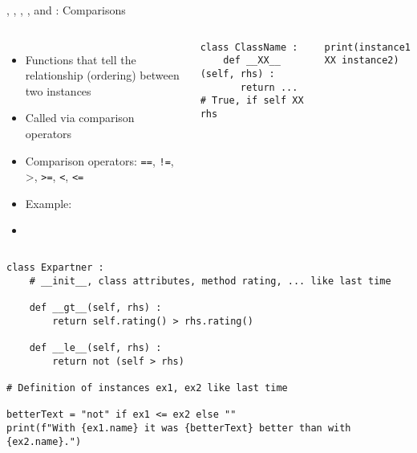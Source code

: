 
\begin{frame}[fragile]{, , , ,  and : Comparisons}
%
\begin{columns}[T]
\begin{itemize}
\item Functions that tell the relationship (ordering) between two instances
\item Called via comparison operators
\item Comparison operators: \texttt{==}, \texttt{!=}, >, \texttt{>=}, \texttt{<}, \texttt{<=}
\item Example:  
\item[\Thus] 
\end{itemize}
%
\begin{codebox}
\begin{verbatim}
class ClassName :
    def __XX__ (self, rhs) :
       return ... # True, if self XX rhs
\end{verbatim}
\end{codebox}
%
\begin{codebox}
\begin{verbatim}
print(instance1 XX instance2)
\end{verbatim}
\end{codebox}
\end{columns}
%
\end{frame}


\begin{frame}[fragile]
%
\begin{codebox}
\begin{verbatim}
class Expartner :
    # __init__, class attributes, method rating, ... like last time
    
    def __gt__(self, rhs) :
        return self.rating() > rhs.rating()
    
    def __le__(self, rhs) :
        return not (self > rhs)

# Definition of instances ex1, ex2 like last time

betterText = "not" if ex1 <= ex2 else ""
print(f"With {ex1.name} it was {betterText} better than with {ex2.name}.")
\end{verbatim}
\end{codebox}
%
\end{frame}

